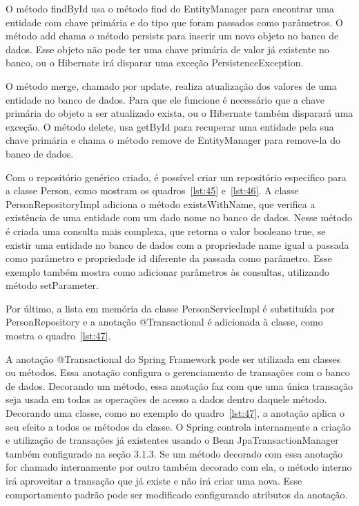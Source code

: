 \documentclass[a4paper,12pt]{article}
\newcommand{\javacode}[3] {
	
	\FloatBarrier
}
\begin{document}
O método findById usa o método find do EntityManager para encontrar uma entidade com chave primária e do tipo que foram passados como parâmetros. O método add chama o método persists para inserir um novo objeto no banco de dados. Esse objeto não pode ter uma chave primária de valor já existente no banco, ou o Hibernate irá disparar uma exceção PersistenceException.

O método merge, chamado por update, realiza atualização dos valores de uma entidade no banco de dados. Para que ele funcione é necessário que a chave primária do objeto a ser atualizado exista, ou o Hibernate também disparará uma exceção. O método delete, usa getById para recuperar uma entidade pela sua chave primária e chama o método remove de EntityManager para remove-la do banco de dados.

Com o repositório genérico criado, é possível criar um repositório especifico para a classe Person, como mostram os quadros~\ref{lst:45} e~\ref{lst:46}. A classe PersonRepositoryImpl adiciona o método existsWithName, que verifica a existência de uma entidade com um dado nome no banco de dados. Nesse método é criada uma consulta mais complexa, que retorna o valor booleano true, se existir uma entidade no banco de dados com a propriedade name igual a passada como parâmetro e propriedade id diferente da passada como parâmetro. Esse exemplo também mostra como adicionar parâmetros às consultas, utilizando método setParameter.

\javacode{code/45.txt}{Interface PersonRepository}{lst:45}

\javacode{code/46.txt}{Classe PersonRepositoryImpl}{lst:46}

Por último, a lista em memória da classe PersonServiceImpl é substituída por PersonRepository e a anotação @Transactional é adicionada à classe, como mostra o quadro~\ref{lst:47}.

\javacode{code/47.txt}{PersonServiceImpl fazendo uso de PersonRepository}{lst:47}

A anotação @Transactional do Spring Framework pode ser utilizada em classes ou métodos. Essa anotação configura o gerenciamento de transações com o banco de dados. Decorando um método, essa anotação faz com que uma única transação seja usada em todas as operações de acesso a dados dentro daquele método. Decorando uma classe, como no exemplo do quadro~\ref{lst:47}, a anotação aplica o seu efeito a todos os métodos da classe.  O Spring controla internamente a criação e utilização de transações já existentes usando o Bean JpaTransactionManager também configurado na seção 3.1.3. Se um método decorado com essa anotação for chamado internamente por outro também decorado com ela, o método interno irá aproveitar a transação que já existe e não irá criar uma nova. Esse comportamento padrão pode ser modificado configurando atributos da anotação. 
\end{document}
